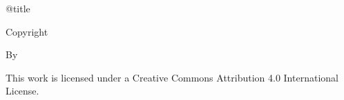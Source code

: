 \begin{center}
  \csname @title\endcsname

  \vspace{5\baselineskip}
  Copyright \MyYear
  \par\vspace{\baselineskip} By
  \par\vspace{\baselineskip} \MyAuthor

  \vspace{5\baselineskip}%
  This work is licensed under a Creative Commons Attribution 4.0 International
  License.
\end{center}

\clearpage
